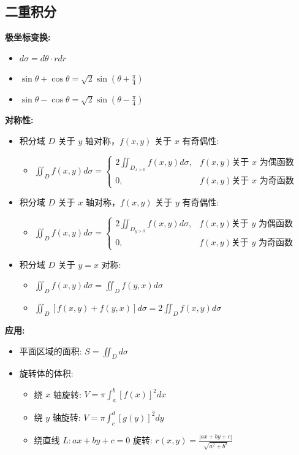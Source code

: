 \documentclass[10pt]{article}
\begin{document}
\newpage
\begin{multicols}{2}
\raggedcolumns


\section*{二重积分}

\textbf{极坐标变换:}
\begin{itemize}
  \item \(d\sigma = d\theta \cdot r dr\)
  \item \(\sin\theta + \cos\theta = \sqrt{2}\sin(\theta + \frac{\pi}{4})\)
  \item \(\sin\theta - \cos\theta = \sqrt{2}\sin(\theta - \frac{\pi}{4})\)
\end{itemize}

\textbf{对称性:}
\begin{itemize}
  \item 积分域 \(D\) 关于 \(y\) 轴对称，\(f(x,y)\) 关于 \(x\) 有奇偶性:
    \begin{itemize}
      \item \(\iint_D f(x,y) d\sigma = \begin{cases} 2\iint_{D_{x>0}} f(x,y) d\sigma, & f(x,y) \text{关于 } x \text{ 为偶函数} \\ 0, & f(x,y) \text{关于 } x \text{ 为奇函数} \end{cases}\)
    \end{itemize}
  \item 积分域 \(D\) 关于 \(x\) 轴对称，\(f(x,y)\) 关于 \(y\) 有奇偶性:
    \begin{itemize}
      \item \(\iint_D f(x,y) d\sigma = \begin{cases} 2\iint_{D_{y>0}} f(x,y) d\sigma, & f(x,y) \text{关于 } y \text{ 为偶函数} \\ 0, & f(x,y) \text{关于 } y \text{ 为奇函数} \end{cases}\)
    \end{itemize}
  \item 积分域 \(D\) 关于 \(y = x\) 对称:
    \begin{itemize}
      \item \(\iint_D f(x,y) d\sigma = \iint_D f(y,x) d\sigma\)
      \item \(\iint_D [f(x,y) + f(y,x)] d\sigma = 2\iint_D f(x,y) d\sigma\)
    \end{itemize}
\end{itemize}

\textbf{应用:}
\begin{itemize}
  \item 平面区域的面积: \(S = \iint_D d\sigma\)
  \item 旋转体的体积:
    \begin{itemize}
      \item 绕 \(x\) 轴旋转: \(V = \pi \int_a^b [f(x)]^2 dx\)
      \item 绕 \(y\) 轴旋转: \(V = \pi \int_c^d [g(y)]^2 dy\)
      \item 绕直线 \(L: ax + by + c = 0\) 旋转: \(r(x,y) = \frac{|ax + by + c|}{\sqrt{a^2 + b^2}}\)
    \end{itemize}
\end{itemize}


\end{multicols}
\end{document}
